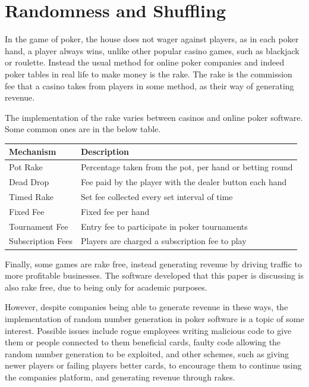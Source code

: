 \section{Randomness and Shuffling}
In the game of poker, the house does not wager against players, as in each
poker hand, a player always wins, unlike other popular casino games, such as 
blackjack or roulette. Instead the usual method for online poker companies and
indeed poker tables in real life to make money is the rake. The rake is the 
commission fee that a casino takes from players in some method, as their way 
of generating revenue.

The implementation of the rake varies between casinos and online poker
software. Some common ones are in the below table.

\begin{center}
    \begin{tabular}{l l}
    \toprule
    Mechanism           & Description                                               \\
    \midrule
    Pot Rake            & Percentage taken from the pot, per hand or betting round  \\ \addlinespace
    Dead Drop           & Fee paid by the player with the dealer button each hand   \\ \addlinespace
    Timed Rake          & Set fee collected every set interval of time              \\ \addlinespace
    Fixed Fee           & Fixed fee per hand                                        \\ \addlinespace
    Tournament Fee      & Entry fee to participate in poker tournaments             \\ \addlinespace
    Subscription Fees   & Players are charged a subscription fee to play            \\
    \bottomrule
    \end{tabular}
\end{center}

Finally, some games are rake free, instead generating revenue by driving
traffic to more profitable businesses. The software developed that this paper
is discussing is also rake free, due to being only for academic purposes.

However, despite companies being able to generate revenue in these ways, the
implementation of random number generation in poker software is a topic of
some interest. Possible issues include rogue employees writing malicious
code to give them or people connected to them beneficial cards, faulty code
allowing the random number generation to be exploited, and other schemes, such
as giving newer players or failing players better cards, to encourage them to 
continue using the companies platform, and generating revenue through rakes.

